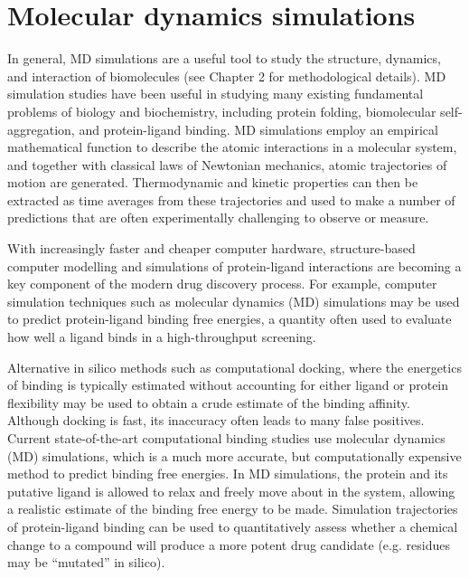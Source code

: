 \section{Molecular dynamics simulations}
In general, MD simulations are a useful tool to study the structure, dynamics, and interaction of biomolecules (see Chapter 2 for methodological details).  MD simulation studies have been useful in studying many existing fundamental problems of biology and biochemistry, including protein folding, biomolecular self-aggregation, and protein-ligand binding.  MD simulations employ an empirical mathematical function to describe the atomic interactions in a molecular system, and together with classical laws of Newtonian mechanics, atomic trajectories of motion are generated.  Thermodynamic and kinetic properties can then be extracted as time averages from these trajectories and used to make a number of predictions that are often experimentally challenging to observe or measure.  

With increasingly faster and cheaper computer hardware, structure-based computer modelling and simulations of protein-ligand interactions are becoming a key component of the modern drug discovery process. For example, computer simulation techniques such as molecular dynamics (MD) simulations may be used to predict protein-ligand binding free energies,  a quantity often used to evaluate how well a ligand binds in a high-throughput screening.

Alternative in silico methods such as computational docking, where the energetics of binding is typically estimated without accounting for either ligand or protein flexibility may be used to obtain a crude estimate of the binding affinity.  Although docking is fast, its inaccuracy often leads to many false positives.  Current state-of-the-art computational binding studies use molecular dynamics (MD) simulations, which is a much more accurate, but computationally expensive method to predict binding free energies.   In MD simulations, the protein and its putative ligand is allowed to relax and freely move about in the system, allowing a realistic estimate of the binding free energy to be made. Simulation trajectories of protein-ligand binding can be used to quantitatively assess whether a chemical change to a compound will produce a more potent drug candidate (e.g.  residues may be ``mutated'' in silico).


